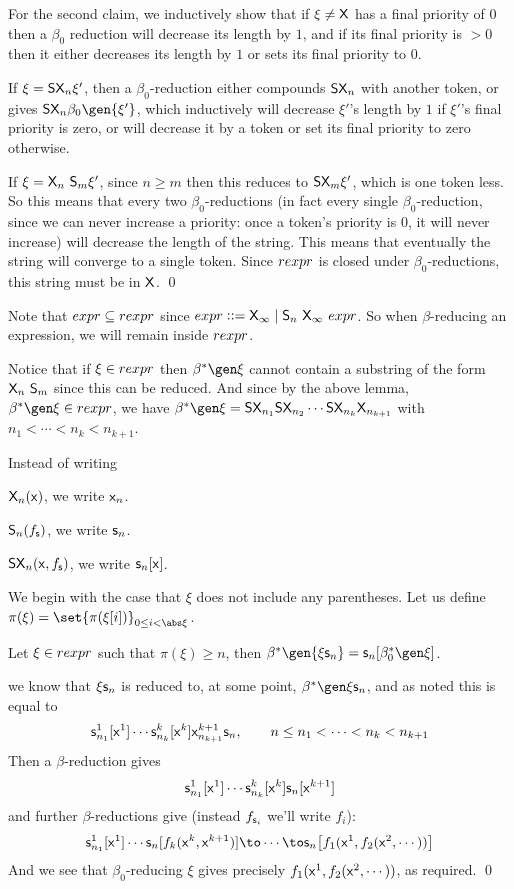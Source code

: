 For the second claim, we inductively show that if $\xi\neq{\sf X}$ has a final priority of $0$ then a $\beta_0$ reduction will decrease its length by $1$, and if its final priority is $>0$ then it either
decreases its length by $1$ or sets its final priority to $0$.
\benum
    \item If $\xi={\sf S}{\sf X}_n\xi'$, then a $\beta_0$-reduction either compounds ${\sf S}{\sf X}_n$ with another token, or gives $\s S\s X_n\beta_0\gen{\xi'}$, which inductively will decrease $\xi'$'s length by $1$
        if $\xi'$'s final priority is zero, or will decrease it by a token or set its final priority to zero otherwise.
    \item If $\xi={\sf X}_n\ {\sf S}_m\xi'$, since $n\geq m$ then this reduces to ${\sf S}{\sf X}_m\xi'$, which is one token less.
\eenum
So this means that every two $\beta_0$-reductions (in fact every single $\beta_0$-reduction, since we can never increase a priority: once a token's priority is $0$, it will never increase) will decrease
the length of the string.
This means that eventually the string will converge to a single token.
Since ${\sl rexpr}$ is closed under $\beta_0$-reductions, this string must be in ${\sf X}$.
\qed

Note that ${\sl expr}\subseteq{\sl rexpr}$ since ${\sl expr}\mathrel{{\mathop:}{\mathop:}{=}}{\sf X}_\infty\mid{\sf S}_n\ {\sf X}_\infty\ {\sl expr}$.
So when $\beta$-reducing an expression, we will remain inside ${\sl rexpr}$.

Notice that if $\xi\in{\sl rexpr}$ then $\beta^*\gen\xi$ cannot contain a substring of the form ${\sf X}_n\ {\sf S}_m$ since this can be reduced.
And since by the above lemma, $\beta^*\gen\xi\in{\sl rexpr}$, we have $\beta^*\gen\xi=\s S\s X_{n_1}\s S\s X_{n_2}\cdots\s S\s X_{n_k}\s X_{n_{k+1}}$ with $n_1<\cdots<n_k<n_{k+1}$.

Instead of writing
\blist
    \item ${\sf X}_n({\sf x})$, we write ${\sf x}_n$.
    \item ${\sf S}_n(f_{{\sf s}})$, we write ${\sf s}_n$.
    \item ${\sf S}{\sf X}_n({\sf x},f_{{\sf s}})$, we write ${\sf s}_n[{\sf x}]$.
\elist

We begin with the case that $\xi$ does not include any parentheses.
Let us define $\pi(\xi)=\set{\pi(\xi[i])}_{0\leq i<\abs\xi}$.

\lemm
    Let $\xi\in{\sl rexpr}$ such that $\pi(\xi)\geq n$, then $\beta^*\gen{\xi\s s_n}=\s s_n[\beta^*_0\gen\xi]$.
\elemm

\Proof we know that $\xi{\sf s}_n$ is reduced to, at some point, $\beta^*\gen\xi\s s_n$, and as noted this is equal to
$$ {\sf s}_{n_1}^1[{\sf x}^1]\cdots{\sf s}^k_{n_k}[{\sf x}^k]{\sf x}^{k+1}_{n_{k+1}}{\sf s}_n,\qquad n\leq n_1<\cdots<n_k<n_{k+1} $$
Then a $\beta$-reduction gives
$$ {\sf s}^1_{n_1}[{\sf x}^1]\cdots{\sf s}^k_{n_k}[{\sf x}^k]{\sf s}_n[{\sf x}^{k+1}] $$
and further $\beta$-reductions give (instead $f_{{\sf s}_i}$ we'll write $f_i$):
$$ \s s^1_{n_1}[\s x^1]\cdots\s s_n[f_k(\s x^k,\s x^{k+1})] \to \cdots \to \s s_n\bigl[f_1(\s x^1,f_2(\s x^2,\cdots))\bigr] $$
And we see that $\beta_0$-reducing $\xi$ gives precisely $f_1({\sf x}^1,f_2({\sf x}^2,\cdots))$, as required.
\qed

